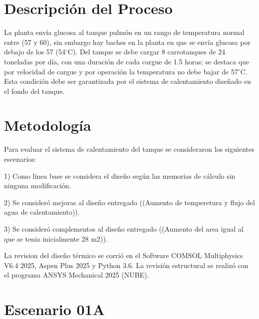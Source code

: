 \documentclass[12pt,a4paper]{elsarticle}
\begin{document}
\section{Descripción del Proceso}

La planta envía glucosa al tanque pulmón en un rango de temperatura normal entre (57 y 60), sin embargo hay baches en la planta en que se envía glucosa por debajo de los 57 (54$^\circ$C). Del tanque se debe cargar 8 carrotanques de 24 toneladas por día, con una duración de cada cargue de 1.5 horas; se destaca que por velocidad de cargue y por operación la temperatura no debe bajar de 57$^\circ$C. Esta condición debe ser garantizada por el sistema de calentamiento diseñado en el fondo del tanque.












\section{Metodología}


Para evaluar el sistema de calentamiento del tanque se consideraron los siguientes escenarios:

1) Como línea base se considera el diseño según las memorias de cálculo sin ninguna modificación.

2) Se consideró mejoras al diseño entregado ((Aumento de temperetura y flujo del agua de calentamiento)).

3) Se consideró complementos al diseño entregado ((Aumento del area igual al que se tenia inicialmente 28 m2)).

La revision del diseño  térmico se corrió en el Software COMSOL Multiphysics V6.4 2025, Aspen Plus 2025 y Python 3.6. La revisión estructural se realizó con el programa ANSYS Mechanical 2025 (NUBE).


\section{Escenario 01A}
\end{document}
